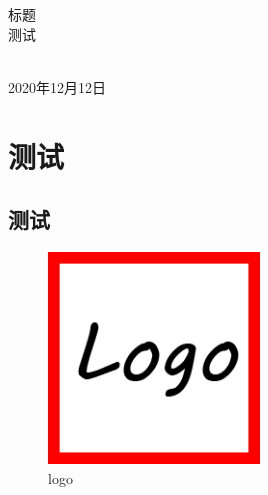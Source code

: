 \documentclass[12pt, oneside]{article}
\begin{document}
\begin{titlepage}

\begin{center}
{\LARGE 标题 }\\[5cm]
{\normalsize 测试}\\[3cm]
\begin{minipage}[t]{3cm}
\centering
\end{minipage}\\[3cm]
{\large 2020年12月12日}
\end{center} 

\end{titlepage}

\pagestyle{fancy}
\section{测试}
\subsection{测试}

\newpage
\begin{figure}[h]
\begin{center}
\includegraphics[width=0.50\textwidth]{pic/logo.png}
\caption{logo}
\label{pic1}
\end{center}
\end{figure}
\newpage
\end{document}
